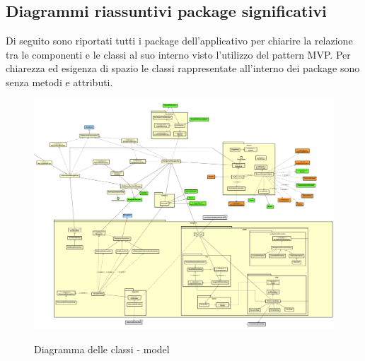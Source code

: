 \documentclass[../DefinizioneDiProdotto.tex,lanscape]{subfiles}
\begin{document}
	
\subsection{Diagrammi riassuntivi package significativi}
Di seguito sono riportati tutti i package dell'applicativo per chiarire la relazione tra le componenti e le classi al suo interno visto l'utilizzo del pattern MVP. Per chiarezza ed esigenza di spazio le classi rappresentate all'interno dei package sono senza metodi e attributi.

\begin{figure}[H]
	\includegraphics[angle=90,width=\textwidth, height=\textheight, keepaspectratio]{diagrams/ModelCompleteNoMethods/PNGpackage/model}
	\label{modelPackage}
	\caption{Diagramma delle classi - model}
\end{figure}
\end{document}
